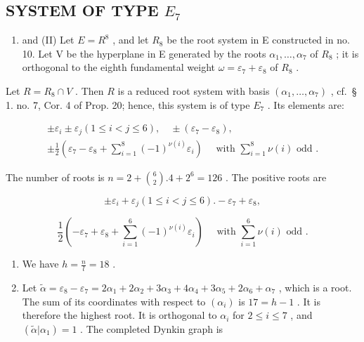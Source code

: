 \subsection{\texorpdfstring{SYSTEM OF TYPE \(E_{7}\)}{SYSTEM OF TYPE E\_7}}

\begin{enumerate}
\def\labelenumi{(\Roman{enumi})}
\tightlist
\item
  and (II) Let \(E = R^{8}\) , and let \(R_{8}\) be the root system in E constructed in no. 10. Let V be the hyperplane in E generated by the roots \(\alpha_{1}, \ldots, \alpha_{7}\) of \(R_{8}\) ; it is orthogonal to the eighth fundamental weight \(\omega = \varepsilon_{7} + \varepsilon_{8}\) of \(R_{8}\) .
\end{enumerate}

Let \(R = R_{8} \cap V\) . Then \(R\) is a reduced root system with basis \((\alpha_{1}, \ldots, \alpha_{7})\) , cf.~§ 1. no. 7, Cor. 4 of Prop. 20; hence, this system is of type \(E_{7}\) . Its elements are:

\[
\begin{array}{c} \pm \varepsilon_ {i} \pm \varepsilon_ {j} (1 \leqslant i < j \leqslant 6), \quad \pm (\varepsilon_ {7} - \varepsilon_ {8}), \\ \pm \frac {1}{2} (\varepsilon_ {7} - \varepsilon_ {8} + \sum_ {i = 1} ^ {8} (- 1) ^ {\nu (i)} \varepsilon_ {i}) \quad \text { with } \sum_ {i = 1} ^ {8} \nu (i) \text { odd }. \end{array}
\]

The number of roots is \(n = 2 + \binom{6}{2}.4 + 2^6 = 126\) . The positive roots are

\[
\pm \varepsilon_ {i} + \varepsilon_ {j} (1 \leqslant i <   j \leqslant 6). - \varepsilon_ {7} + \varepsilon_ {8},
\]

\[
\frac {1}{2} \left(- \varepsilon_ {7} + \varepsilon_ {8} + \sum_ {i = 1} ^ {6} (- 1) ^ {\nu (i)} \varepsilon_ {i}\right) \quad \text { with } \sum_ {i = 1} ^ {6} \nu (i) \text { odd }.
\]

\begin{enumerate}
\def\labelenumi{(\Roman{enumi})}
\setcounter{enumi}{2}
\item
  We have \(h = \frac{n}{l} = 18\) .
\item
  Let \(\tilde{\alpha} = \varepsilon_8 - \varepsilon_7 = 2\alpha_1 + 2\alpha_2 + 3\alpha_3 + 4\alpha_4 + 3\alpha_5 + 2\alpha_6 + \alpha_7\) , which is a root. The sum of its coordinates with respect to \((\alpha_i)\) is \(17 = h - 1\) . It is therefore the highest root. It is orthogonal to \(\alpha_i\) for \(2 \leqslant i \leqslant 7\) , and \((\tilde{\alpha}|\alpha_1) = 1\) . The completed Dynkin graph is
\end{enumerate}

